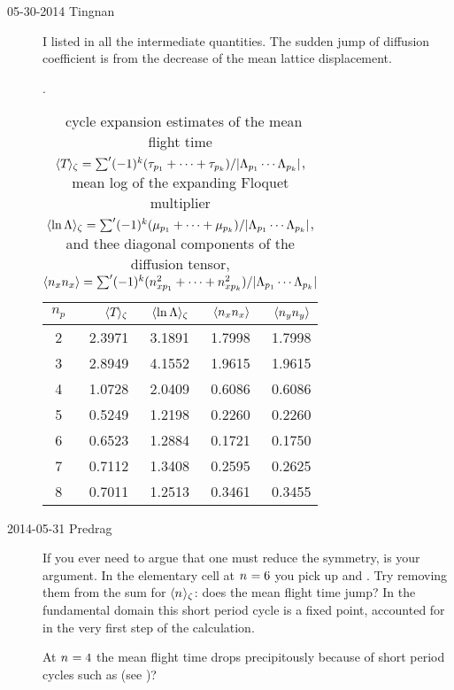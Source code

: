 \begin{description}
\item[05-30-2014 Tingnan]
I listed in  all the intermediate quantities. The
sudden jump of diffusion coefficient is from the decrease of the mean
lattice displacement.

\begin{table}[htbp]
  \centering
  \caption{\Dzeta\ cycle expansion estimates of
  the mean flight time
  $\langle {{\ensuremath{T_{}}}} \rangle_\zeta
  =\sum^{\prime}(-1)^{k}(\tau_{p_1}+\cdots+\tau_{p_k})/\vert\Lambda_{p_1}\cdots\Lambda_{p_k}\vert$,
  mean log of the expanding Floquet multiplier
  $\langle {\ln\ensuremath{\Lambda}} \rangle_\zeta
  =\sum^{\prime}(-1)^{k}(\mu_{p_1}+\cdots+\mu_{p_k})/\vert\Lambda_{p_1}\cdots\Lambda_{p_k}\vert$,
  and thee diagonal components of the diffusion tensor,
  $\langle {n_{x}n_{x}} \rangle
    =\sum^{\prime}(-1)^{k}(n_{xp_1}^2+\cdots+n_{xp_k}^2)/\vert\Lambda_{p_1}\cdots\Lambda_{p_k}\vert$}.
    \begin{tabular}{c|r|r|r|r}
    $n_p$ & $\langle {{\ensuremath{T_{}}}} \rangle_\zeta$
               & $\langle {\ln\ensuremath{\Lambda}} \rangle_\zeta$
                        & $\langle {n_{x}n_{x}} \rangle$
                                 & $\langle {n_{y}n_{y}} \rangle$ \\
    \hline
    2 & 2.3971 & 3.1891 & 1.7998 & 1.7998 \\
    3 & 2.8949 & 4.1552 & 1.9615 & 1.9615 \\
    4 & 1.0728 & 2.0409 & 0.6086 & 0.6086 \\
    5 & 0.5249 & 1.2198 & 0.2260 & 0.2260 \\
    6 & 0.6523 & 1.2884 & 0.1721 & 0.1750 \\
    7 & 0.7112 & 1.3408 & 0.2595 & 0.2625 \\
    8 & 0.7011 & 1.2513 & 0.3461 & 0.3455 \\
    \end{tabular}%
  \label{tab:addlabel}%
\end{table}

\item[2014-05-31 Predrag]
If you ever need to argue that one must reduce the symmetry,
 is your argument. In the elementary cell at
${n_{}}=6$ you pick up  and
. Try removing them from the sum for
$\langle {{\ensuremath{n_{}}}} \rangle_\zeta$: does the mean flight time jump? In the
fundamental domain this short period cycle is a fixed point, accounted
for in the very first step of the calculation.

At ${n_{}}=4$  the mean flight time drops precipitously because of
short period cycles such as
(see )?


\end{description}
